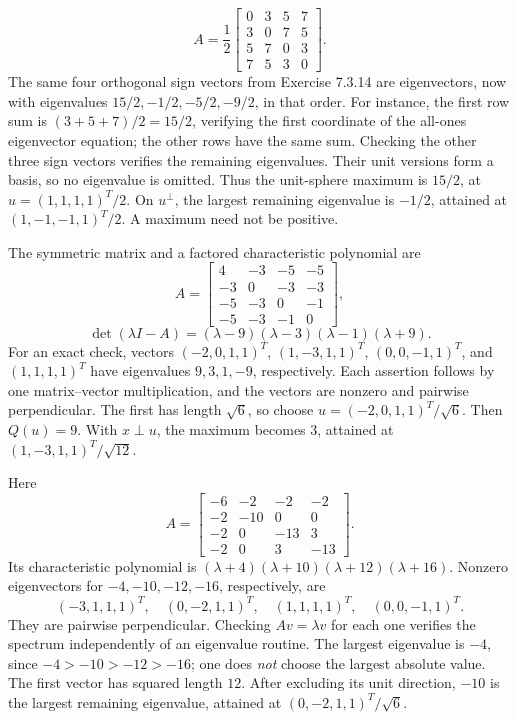 \[
 A=\frac12\begin{bmatrix}0&3&5&7\\3&0&7&5\\5&7&0&3\\7&5&3&0\end{bmatrix}.
\]
The same four orthogonal sign vectors from Exercise 7.3.14 are eigenvectors,
now with eigenvalues $15/2,-1/2,-5/2,-9/2$, in that order. For instance,
the first row sum is $(3+5+7)/2=15/2$, verifying the first coordinate
of the all-ones eigenvector equation; the other rows have the same sum.
Checking the other three sign vectors verifies the remaining eigenvalues.
Their unit versions form a basis, so no eigenvalue is omitted.
Thus the unit-sphere maximum is $15/2$, at $u=(1,1,1,1)^T/2$.
On $u^\perp$, the largest remaining eigenvalue is $-1/2$, attained at
$(1,-1,-1,1)^T/2$. A maximum need not be positive.

The symmetric matrix and a factored characteristic polynomial are
\[
 A=\begin{bmatrix}4&-3&-5&-5\\-3&0&-3&-3\\-5&-3&0&-1\\-5&-3&-1&0\end{bmatrix},
\]
\[
 \det(\lambda I-A)=(\lambda-9)(\lambda-3)(\lambda-1)(\lambda+9).
\]
For an exact check, vectors $(-2,0,1,1)^T$, $(1,-3,1,1)^T$,
$(0,0,-1,1)^T$, and $(1,1,1,1)^T$ have eigenvalues $9,3,1,-9$,
respectively. Each assertion follows by one matrix--vector multiplication,
and the vectors are nonzero and pairwise perpendicular.
The first has length $\sqrt6$, so choose
$u=(-2,0,1,1)^T/\sqrt6$. Then $Q(u)=9$. With $x\perp u$,
the maximum becomes $3$, attained at $(1,-3,1,1)^T/\sqrt{12}$.

Here
\[
 A=\begin{bmatrix}-6&-2&-2&-2\\-2&-10&0&0\\-2&0&-13&3\\-2&0&3&-13\end{bmatrix}.
\]
Its characteristic polynomial is
$(\lambda+4)(\lambda+10)(\lambda+12)(\lambda+16)$.
Nonzero eigenvectors for $-4,-10,-12,-16$, respectively, are
\[
 (-3,1,1,1)^T,\quad(0,-2,1,1)^T,\quad(1,1,1,1)^T,\quad(0,0,-1,1)^T.
\]
They are pairwise perpendicular. Checking $Av=\lambda v$ for each
one verifies the spectrum independently of an eigenvalue routine.
The largest eigenvalue is $-4$, since $-4>-10>-12>-16$; one does
\emph{not} choose the largest absolute value. The first vector has squared
length $12$. After excluding its unit direction, $-10$ is the largest
remaining eigenvalue, attained at $(0,-2,1,1)^T/\sqrt6$.

